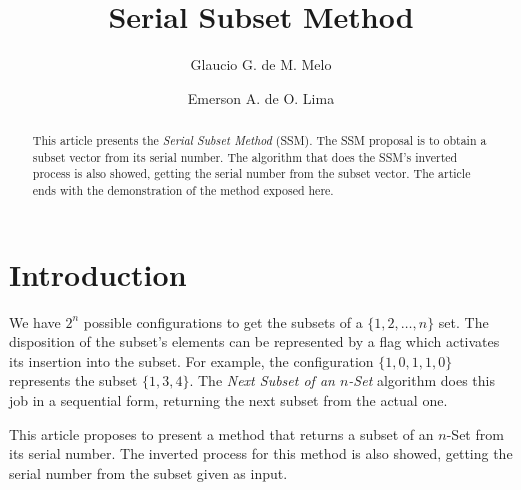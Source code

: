 \documentclass {amsart}
\newcommand{\emerson}{Emerson A. de O. Lima}
\newcommand{\glaucio}{Glaucio G. de M. Melo}
\begin{document}
\title[Serial Subset Method]
 {Serial Subset Method}


\author[Melo]{\glaucio}
\address[Melo]{Departamento de Estat\'{\i}stica e Inform\'{a}tica - UNICAP}


\author[Oliveira-Lima]{\emerson}
\address[Oliveira-Lima]{Departamento de Estat\'{\i}stica e Inform\'{a}tica - UNICAP}




\begin{abstract}
This article presents the \emph{Serial Subset Method} (SSM). The
SSM proposal is to obtain a subset vector from its serial number.
The algorithm that does the SSM's inverted process is also showed,
getting the serial number from the subset vector. The article ends
with the demonstration of the method exposed here.
\end{abstract}
 \maketitle
\section*{Introduction}
We have {$2^n$} possible configurations to get the subsets of a {$\{1,2,\ldots,n\}$} set. The disposition of the subset's elements can be represented by a flag which activates its insertion into the subset. For example, the configuration {$\{1,0,1,1,0\}$} represents the subset {$\{1,3,4\}$}. The \emph{Next Subset of an {$n$}-Set}\cite{wi} algorithm does this job in a sequential form, returning the next subset from the actual one.

This article proposes to present a method that returns a subset of an {$n$}-Set from its serial number. The inverted process for this method is also showed, getting the serial number from the subset given as input.
\end{document}
